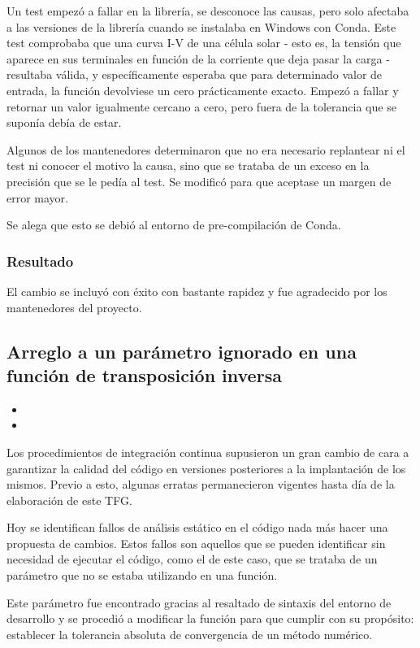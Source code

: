 Un test empezó a fallar en la librería, se desconoce las causas, pero solo afectaba a las versiones de la librería cuando se instalaba en Windows con Conda. Este test comprobaba que una curva I-V de una célula solar - esto es, la tensión que aparece en sus terminales en función de la corriente que deja pasar la carga - resultaba válida, y específicamente esperaba que para determinado valor de entrada, la función devolviese un cero prácticamente exacto. Empezó a fallar y retornar un valor igualmente cercano a cero, pero fuera de la tolerancia que se suponía debía de estar.

Algunos de los mantenedores determinaron que no era necesario replantear ni el test ni conocer el motivo la causa, sino que se trataba de un exceso en la precisión que se le pedía al test. Se modificó para que aceptase un margen de error mayor.

Se alega que esto se debió al entorno de pre-compilación de Conda.

\subsubsection{Resultado}

El cambio se incluyó con éxito con bastante rapidez y fue agradecido por los mantenedores del proyecto.

\subsection{Arreglo a un parámetro ignorado en una función de transposición inversa}

\begin{itemize}
    \item {}
    \item {}
\end{itemize}

Los procedimientos de integración continua supusieron un gran cambio de cara a garantizar la calidad del código en versiones posteriores a la implantación de los mismos. Previo a esto, algunas erratas permanecieron vigentes hasta día de la elaboración de este TFG.

Hoy se identifican fallos de análisis estático en el código nada más hacer una propuesta de cambios. Estos fallos son aquellos que se pueden identificar sin necesidad de ejecutar el código, como el de este caso, que se trataba de un parámetro que no se estaba utilizando en una función.

Este parámetro fue encontrado gracias al resaltado de sintaxis del entorno de desarrollo y se procedió a modificar la función para que cumplir con su propósito: establecer la tolerancia absoluta de convergencia de un método numérico.

